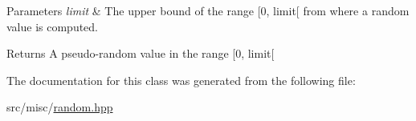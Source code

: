 \begin{DoxyParams}{Parameters}
{\em limit} & The upper bound of the range \mbox{[}0, limit\mbox{[} from where a random value is computed. \\
\hline
\end{DoxyParams}
\begin{DoxyReturn}{Returns}
A pseudo-\/random value in the range \mbox{[}0, limit\mbox{[} 
\end{DoxyReturn}


The documentation for this class was generated from the following file\+:\begin{DoxyCompactItemize}
\item 
src/misc/\hyperlink{random_8hpp}{random.\+hpp}\end{DoxyCompactItemize}
